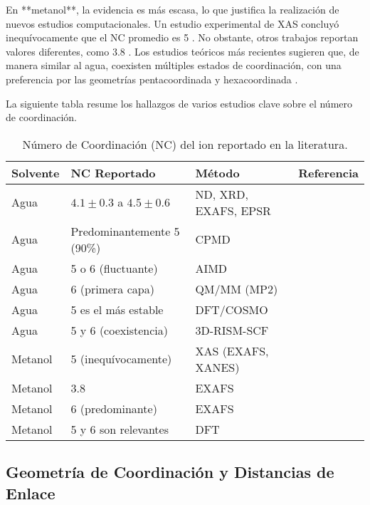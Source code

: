 En **metanol**, la evidencia es más escasa, lo que justifica la realización de nuevos estudios computacionales. Un estudio experimental de XAS concluyó inequívocamente que el NC promedio es 5 \cite{Me-2012-01}. No obstante, otros trabajos reportan valores diferentes, como 3.8 \cite{Me-2023-01}. Los estudios teóricos más recientes sugieren que, de manera similar al agua, coexisten múltiples estados de coordinación, con una preferencia por las geometrías pentacoordinada y hexacoordinada \cite{Me-2022-01, Me-2023-02}.

La siguiente tabla resume los hallazgos de varios estudios clave sobre el número de coordinación.

\begin{table}[h!]
\centering
\caption{Número de Coordinación (NC) del ion  reportado en la literatura.}
\label{tab:coordination_number}
\begin{tabular}{@{}llll@{}}
\toprule
Solvente & NC Reportado & Método & Referencia \\ \midrule
Agua     & $4.1 \pm 0.3$ a $4.5 \pm 0.6$ & ND, XRD, EXAFS, EPSR & \cite{Wa-2013-01} \\
Agua     & Predominantemente 5 (90\%)   & CPMD                      & \cite{Wa-2005-02} \\
Agua     & 5 o 6 (fluctuante)           & AIMD                      & \cite{Wa-2004-02} \\
Agua     & 6 (primera capa)             & QM/MM (MP2)               & \cite{Cu-2004-01} \\
Agua     & 5 es el más estable          & DFT/COSMO                 & \cite{Wa-2008-01} \\
Agua     & 5 y 6 (coexistencia)         & 3D-RISM-SCF               & \cite{Wa-2019-01} \\
Metanol  & 5 (inequívocamente)          & XAS (EXAFS, XANES)        & \cite{Me-2012-01} \\
Metanol  & 3.8                          & EXAFS                     & \cite{Me-2023-01} \\
Metanol  & 6 (predominante)             & EXAFS                     & \cite{Wa-2020-01} \\
Metanol  & 5 y 6 son relevantes         & DFT                       & \cite{Me-2022-01} \\ \bottomrule
\end{tabular}
\end{table}

\subsection{Geometría de Coordinación y Distancias de Enlace}

